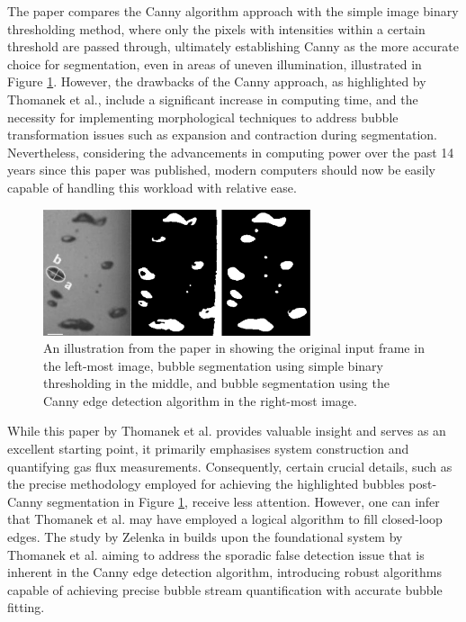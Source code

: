 The paper compares the Canny algorithm approach with the simple image binary thresholding method, where only the pixels with intensities within a certain threshold are passed through, ultimately establishing Canny as the more accurate choice for segmentation, even in areas of uneven illumination, illustrated in Figure \ref{fig:canny_segmentation_compare}. However, the drawbacks of the Canny approach, as highlighted by Thomanek et al., include a significant increase in computing time, and the necessity for implementing morphological techniques to address bubble transformation issues such as expansion and contraction during segmentation. Nevertheless, considering the advancements in computing power over the past 14 years since this paper was published, modern computers should now be easily capable of handling this workload with relative ease.

\begin{figure}[H]
    \centering
    \includegraphics[width=0.7\textwidth]{assets/bubble-segmentation-canny-thresholding.png}
    \caption{An illustration from the paper in \cite{thomanekAutomatedGasBubble2010} showing the original input frame in the left-most image, bubble segmentation using simple binary thresholding in the middle, and bubble segmentation using the Canny edge detection algorithm in the right-most image.}
    \label{fig:canny_segmentation_compare}
\end{figure}

While this paper by Thomanek et al. provides valuable insight and serves as an excellent starting point, it primarily emphasises system construction and quantifying gas flux measurements. Consequently, certain crucial details, such as the precise methodology employed for achieving the highlighted bubbles post-Canny segmentation in Figure \ref{fig:canny_segmentation_compare}, receive less attention. However, one can infer that Thomanek et al. may have employed a logical algorithm to fill closed-loop edges. The study by Zelenka in \cite{zelenkaGasBubbleShape2014a} builds upon the foundational system by Thomanek et al. aiming to address the sporadic false detection issue that is inherent in the Canny edge detection algorithm, introducing robust algorithms capable of achieving precise bubble stream quantification with accurate bubble fitting.

